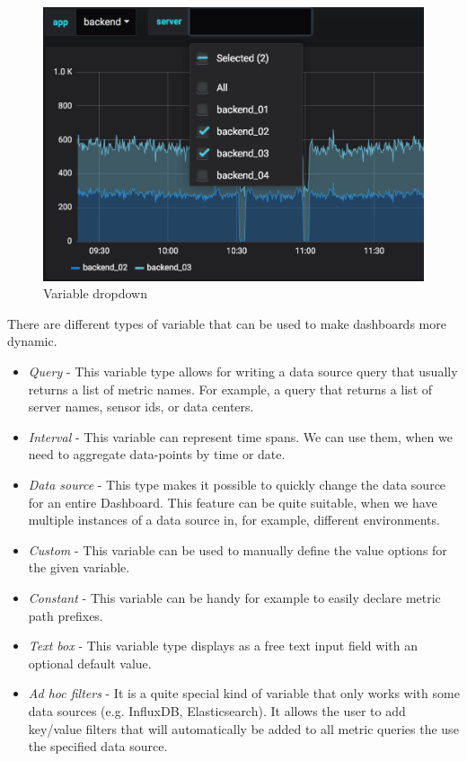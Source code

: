 \begin{figure}[H]
	\centering
	\includegraphics[width=130mm, keepaspectratio]{figures/variable-dropdown.png}
	\caption{Variable dropdown \cite{grafana-variables-dashboard-image}}
	\label{fig:variable-dropdown}
\end{figure}


There are different types of variable that can be used to make dashboards more dynamic.\cite{grafana-variables-types}
\begin{itemize}
	\item \emph{Query} - This variable type allows for writing a data source query that usually returns a list of metric names. For example, a query that returns a list of server names, sensor ids, or data centers.
	\item \emph{Interval} - This variable can represent time spans. We can use them, when we need to aggregate data-points by time or date.
	\item \emph{Data source} - This type makes it possible to quickly change the data source for an entire Dashboard. This feature can be quite suitable, when we have multiple instances of a data source in, for example, different environments.
	\item \emph{Custom} - This variable can be used to manually define the value options for the given variable.
	\item \emph{Constant} - This variable can be handy for example to easily declare metric path prefixes. 
	\item \emph{Text box} - This variable type displays as a free text input field with an optional default value.
	\item \emph{Ad hoc filters} - It is a quite special kind of variable that only works with some data sources (e.g. InfluxDB, Elasticsearch). It allows the user to add key/value filters that will automatically be added to all metric queries the use the specified data source.
\end{itemize}

